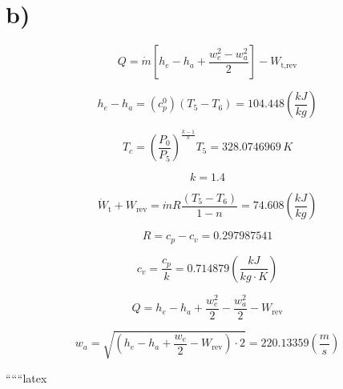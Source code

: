 

\section*{b)}

\[
Q = \dot{m} \left[ h_e - h_a + \frac{w_e^2 - w_a^2}{2} \right] - W_{\text{t,rev}}
\]

\[
h_e - h_a = (c_p^0) (T_5 - T_6) = 104.448 \left( \frac{kJ}{kg} \right)
\]

\[
T_c = \left( \frac{P_0}{P_5} \right)^{\frac{k-1}{k}} T_5 = 328.0746969 \, K
\]

\[
k = 1.4
\]

\[
\dot{W}_{\text{t}} + W_{\text{rev}} = \dot{m} R \frac{(T_5 - T_6)}{1 - n} = 74.608 \left( \frac{kJ}{kg} \right)
\]

\[
R = c_p - c_v = 0.297987541
\]

\[
c_v = \frac{c_p}{k} = 0.714879 \left( \frac{kJ}{kg \cdot K} \right)
\]

\[
Q = h_e - h_a + \frac{w_e^2}{2} - \frac{w_a^2}{2} - W_{\text{rev}}
\]

\[
w_a = \sqrt{(h_e - h_a + \frac{w_e}{2} - W_{\text{rev}}) \cdot 2} = 220.13359 \left( \frac{m}{s} \right)
\]

``````latex